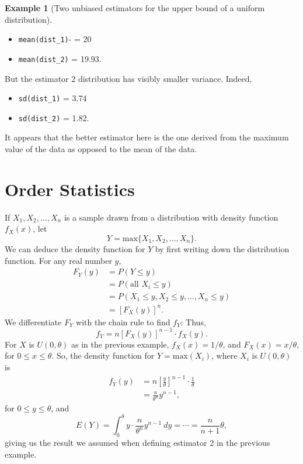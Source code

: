 \documentclass[
]{book}
\providecommand{\tightlist}{%
  \setlength{\itemsep}{0pt}\setlength{\parskip}{0pt}}
\theoremstyle{definition}
\theoremstyle{definition}
\newtheorem{example}{Example}[chapter]
\theoremstyle{definition}
\theoremstyle{definition}
\theoremstyle{remark}
\begin{document}
\begin{example}[Two unbiased estimators for the upper bound of a uniform distribution]
\begin{itemize}
\tightlist
\item
  \texttt{mean(dist\_1)}- = 20
\item
  \texttt{mean(dist\_2)} = 19.93.
\end{itemize}

But the estimator 2 distribution has visibly smaller variance. Indeed,

\begin{itemize}
\tightlist
\item
  \texttt{sd(dist\_1)} = 3.74
\item
  \texttt{sd(dist\_2)} = 1.82.
\end{itemize}

It appears that the better estimator here is the one derived from the maximum value of the data as opposed to the mean of the data.
\end{example}

\section{Order Statistics}\label{order-statistics}

If \(X_1, X_2, \ldots, X_n\) is a sample drawn from a distribution with density function \(f_X(x)\), let \[Y = \text{max}\{X_1, X_2, \ldots, X_n\}.\]
We can deduce the density function for \(Y\) by first writing down the distribution function. For any real number \(y\),
\begin{align*}
F_Y(y) &= P(Y \leq y) \\
      &= P(\text{all }X_i \leq y) \\
      &= P(X_1 \leq y, X_2 \leq y, \ldots, X_n \leq y) \\
      &= \left[F_X(y)\right]^n.
\end{align*}
We differentiate \(F_Y\) with the chain rule to find \(f_Y\):
Thus, \[f_Y = n\left[F_X(y)\right]^{n-1}\cdot f_X(y). \tag{density for the max of sample}\]
For \(X\) is \(U(0,\theta)\) as in the previous example, \(f_X(x) = 1/\theta\), and \(F_X(x) = x/\theta\), for \(0 \leq x \leq \theta\). So, the density function for \(Y = \text{max}(X_i)\), where \(X_i\) is \(U(0,\theta)\) is
\begin{align*}
f_Y(y) &= n \left[\frac{y}{\theta}\right]^{n-1} \cdot \frac{1}{\theta}\\
      &= \frac{n}{\theta^n}y^{n-1},
\end{align*}
for \(0 \leq y \leq \theta\),
and \[E(Y) = \int_0^\theta y \cdot \frac{n}{\theta^n}y^{n-1}~dy = \cdots = \frac{n}{n+1}\theta,\]
giving us the result we assumed when defining estimator 2 in the previous example.
\end{document}
